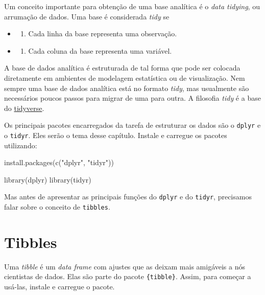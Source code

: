 \documentclass[
]{book}
\newenvironment{Shaded}{\begin{snugshade}}{\end{snugshade}}
\newcommand{\FunctionTok}[1]{\textcolor[rgb]{0.00,0.00,0.00}{#1}}
\newcommand{\NormalTok}[1]{#1}
\newcommand{\StringTok}[1]{\textcolor[rgb]{0.31,0.60,0.02}{#1}}
\providecommand{\tightlist}{%
  \setlength{\itemsep}{0pt}\setlength{\parskip}{0pt}}
\begin{document}
Um conceito importante para obtenção de uma base analítica é o \emph{data tidying}, ou arrumação de dados. Uma base é considerada \emph{tidy} se

\begin{itemize}
\item
  \begin{enumerate}
  \def\labelenumi{\arabic{enumi}.}
  \tightlist
  \item
    Cada linha da base representa uma observação.
  \end{enumerate}
\item
  \begin{enumerate}
  \def\labelenumi{\arabic{enumi}.}
  \setcounter{enumi}{1}
  \tightlist
  \item
    Cada coluna da base representa uma variável.
  \end{enumerate}
\end{itemize}

A base de dados analítica é estruturada de tal forma que pode ser colocada diretamente em ambientes de modelagem estatística ou de visualização. Nem sempre uma base de dados analítica está no formato \emph{tidy}, mas usualmente são necessários poucos passos para migrar de uma para outra. A filosofia \emph{tidy} é a base do \href{https://www.tidyverse.org/}{tidyverse}.

Os principais pacotes encarregados da tarefa de estruturar os dados são o \texttt{dplyr} e o \texttt{tidyr}. Eles serão o tema desse capítulo. Instale e carregue os pacotes utilizando:

\begin{Shaded}
\begin{Highlighting}[]
\FunctionTok{install.packages}\NormalTok{(}\FunctionTok{c}\NormalTok{(}\StringTok{"dplyr"}\NormalTok{, }\StringTok{"tidyr"}\NormalTok{))}

\FunctionTok{library}\NormalTok{(dplyr)}
\FunctionTok{library}\NormalTok{(tidyr)}
\end{Highlighting}
\end{Shaded}

Mas antes de apresentar as principais funções do \texttt{dplyr} e do \texttt{tidyr}, precisamos falar sobre o conceito de \texttt{tibbles}.

\hypertarget{tibbles}{%
\section{Tibbles}\label{tibbles}}

Uma \emph{tibble} é um \emph{data frame} com ajustes que as deixam mais amigáveis a nós cientistas de dados. Elas são parte do pacote \texttt{\{tibble\}}. Assim, para começar a usá-las, instale e carregue o pacote.
\end{document}

